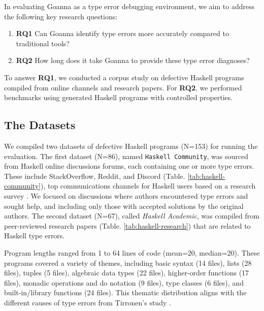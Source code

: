 \documentclass[pdflatex,sn-nature,Numbered]{sn-jnl}%
\begin{document}
In evaluating Goanna as a type error debugging environment, we aim to address the following key research questions:

\begin{enumerate}
    \item \textbf{RQ1} Can Goanna identify type errors more accurately compared to traditional tools?
    \item \textbf{RQ2} How long does it take Goanna to provide these type error diagnoses?
\end{enumerate}

To answer {\bf RQ1}, we conducted a corpus study on defective Haskell programs compiled from online channels and research papers. For {\bf RQ2}, we performed benchmarks using generated Haskell programs with controlled properties.

\subsection{The Datasets} \label{sub:dataset}

We compiled two datasets of defective Haskell programs (N=153) for running the evaluation. The first dataset (N=86), named \texttt{Haskell Community}, was sourced from Haskell online discussions forums, each containing one or more type errors. These include StackOverflow, Reddit, and Discord (Table. \ref{tab:haskell-community}),  top communications channels for Haskell users based on a research survey \cite{Fausak2022-zf}. We focused on discussions where authors encountered type errors and sought help, and including only those with accepted solutions by the original authors. The second dataset (N=67), called \textit{Haskell Academic}, was compiled from peer-reviewed research papers (Table. \ref{tab:haskell-research}) that are related to Haskell type errors.

Program lengths ranged from 1 to 64 lines of code (mean=20, median=20). These programs covered a variety of themes, including basic syntax (14 files), lists (28 files), tuples (5 files), algebraic data types (22 files), higher-order functions (17 files), monadic operations and do notation (9 files), type classes (6 files), and built-in/library functions (24 files). This thematic distribution aligns with the different causes of type errors from Tirronen's study \cite{Tirronen2015-nr}.
\end{document}
